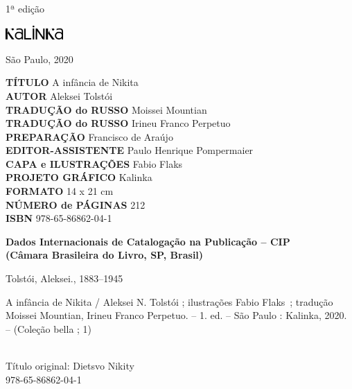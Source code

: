{\vfill

\begin{center}
1ª edição

\smallskip

\includegraphics[width=2.2cm]{./LOGOTIPO_KALINKA.jpg}

São Paulo, 2020
\end{center}

\pagebreak
\flushleft
\pagestyle{empty}
\tiny


\textbf{TÍTULO} A infância de Nikita\\
\textbf{AUTOR} Aleksei Tolstói\\
\textbf{TRADUÇÃO do RUSSO} Moissei Mountian\\
\textbf{TRADUÇÃO do RUSSO} Irineu Franco Perpetuo\\
\textbf{PREPARAÇÃO} Francisco de Araújo\\
\textbf{EDITOR-ASSISTENTE} Paulo Henrique Pompermaier\\
\textbf{CAPA e ILUSTRAÇÕES} Fabio Flaks\\
\textbf{PROJETO GRÁFICO} Kalinka\\
\textbf{FORMATO} 14 x 21 cm\\
\textbf{NÚMERO de PÁGINAS} 212\\
\textbf{ISBN} 978-65-86862-04-1\\

\bigskip

\begin{flushleft}
\textbf{Dados Internacionais de Catalogação na Publicação -- CIP}\\
\textbf{(Câmara Brasileira do Livro, SP, Brasil)}\\
\hrulefill
\end{flushleft}
\hspace{5pt}Tolstói, Aleksei., 1883--1945\\
\hspace{20pt}\parbox{185pt}{A infância de Nikita / Aleksei N. Tolstói ; ilustrações Fabio Flaks~; tradução Moissei Mountian, Irineu Franco Perpetuo. -- 1. ed. -- São Paulo :
Kalinka, 2020. -- (Coleção bella ; 1)}\\[6pt]

\hspace{20pt}Título original: Dietsvo Nikity\\
\hspace{20pt} 978-65-86862-04-1\\[6pt]

}
